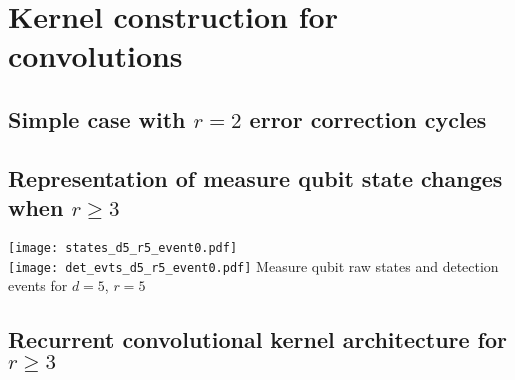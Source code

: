\section{Kernel construction for convolutions}

\subsection{Simple case with $r=2$ error correction cycles}

\subsection{Representation of measure qubit state changes when $r\geq 3$}


\begin{figure*}[htb]
\centering
\texttt{[image: states\_d5\_r5\_event0.pdf]} \\
\texttt{[image: det\_evts\_d5\_r5\_event0.pdf]}
\ccaption
{Measure qubit raw states and detection events for $d=5$, $r=5$}
{
}
\label{fig:d5r5states}
\end{figure*}



\subsection{Recurrent convolutional kernel architecture for $r\geq 3$}
